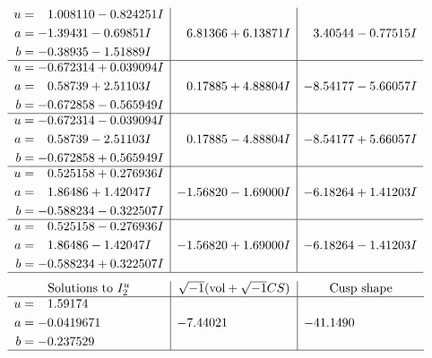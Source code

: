 \documentclass[1p]{elsarticle_modified}
\theoremstyle{definition}
\newcommand{\I}{\sqrt{-1}}
\begin{document}
$$\begin{array}{c|c|c}
\begin{aligned}
u &= \phantom{-}1.008110 - 0.824251 I \\
a &= -1.39431 - 0.69851 I \\
b &= -0.38935 - 1.51889 I\end{aligned}
 & \phantom{-}6.81366 + 6.13871 I & \phantom{-}3.40544 - 0.77515 I \\ \hline\begin{aligned}
u &= -0.672314 + 0.039094 I \\
a &= \phantom{-}0.58739 + 2.51103 I \\
b &= -0.672858 - 0.565949 I\end{aligned}
 & \phantom{-}0.17885 + 4.88804 I & -8.54177 - 5.66057 I \\ \hline\begin{aligned}
u &= -0.672314 - 0.039094 I \\
a &= \phantom{-}0.58739 - 2.51103 I \\
b &= -0.672858 + 0.565949 I\end{aligned}
 & \phantom{-}0.17885 - 4.88804 I & -8.54177 + 5.66057 I \\ \hline\begin{aligned}
u &= \phantom{-}0.525158 + 0.276936 I \\
a &= \phantom{-}1.86486 + 1.42047 I \\
b &= -0.588234 - 0.322507 I\end{aligned}
 & -1.56820 - 1.69000 I & -6.18264 + 1.41203 I \\ \hline\begin{aligned}
u &= \phantom{-}0.525158 - 0.276936 I \\
a &= \phantom{-}1.86486 - 1.42047 I \\
b &= -0.588234 + 0.322507 I\end{aligned}
 & -1.56820 + 1.69000 I & -6.18264 - 1.41203 I\\
 \hline 
 \end{array}$$\newpage$$\begin{array}{c|c|c}  
\text{Solutions to }I^u_{2}& \I (\text{vol} + \sqrt{-1}CS) & \text{Cusp shape}\\
 \hline 
\begin{aligned}
u &= \phantom{-}1.59174\phantom{ +0.000000I} \\
a &= -0.0419671\phantom{ +0.000000I} \\
b &= -0.237529\phantom{ +0.000000I}\end{aligned}
 & -7.44021\phantom{ +0.000000I} & -41.1490\phantom{ +0.000000I}\\
 \hline 
 \end{array}$$\newpage
\end{document}
